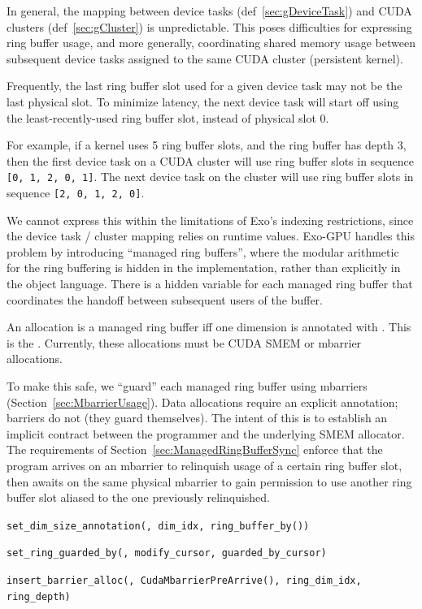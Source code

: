 
In general, the mapping between device tasks (def~\ref{sec:gDeviceTask}) and CUDA clusters (def~\ref{sec:gCluster}) is unpredictable.
This poses difficulties for expressing ring buffer usage, and more generally, coordinating shared memory usage between subsequent device tasks assigned to the same CUDA cluster (persistent kernel).

Frequently, the last ring buffer slot used for a given device task may not be the last physical slot.
To minimize latency, the next device task will start off using the least-recently-used ring buffer slot, instead of physical slot 0.

For example, if a kernel uses 5 ring buffer slots, and the ring buffer has depth 3, then the first device task on a CUDA cluster will use ring buffer slots in sequence \texttt{[0, 1, 2, 0, 1]}.
The next device task on the cluster will use ring buffer slots in sequence \texttt{[2, 0, 1, 2, 0]}.

We cannot express this within the limitations of Exo's indexing restrictions, since the device task / cluster mapping relies on runtime values.
Exo-GPU handles this problem by introducing ``managed ring buffers'', where the modular arithmetic for the ring buffering is hidden in the implementation, rather than explicitly in the object language.
There is a hidden  variable for each managed ring buffer that coordinates the handoff between subsequent users of the buffer.

An allocation is a managed ring buffer iff one dimension is annotated with .
This is the .
Currently, these allocations must be CUDA SMEM or mbarrier allocations.

To make this safe, we ``guard'' each managed ring buffer using mbarriers (Section~\ref{sec:MbarrierUsage}).
Data allocations require an explicit  annotation; barriers do not (they guard themselves).
The intent of this is to establish an implicit contract between the programmer and the underlying SMEM allocator.
The requirements of Section~\ref{sec:ManagedRingBufferSync} enforce that the program arrives on an mbarrier to relinquish usage of a certain ring buffer slot, then awaits on the same physical mbarrier to gain permission to use another ring buffer slot aliased to the one previously relinquished.


\texttt{set\_dim\_size\_annotation(, dim\_idx, ring\_buffer\_by())}

\texttt{set\_ring\_guarded\_by(, modify\_cursor, guarded\_by\_cursor)}

\texttt{insert\_barrier\_alloc(, CudaMbarrierPreArrive(), ring\_dim\_idx, ring\_depth)}




